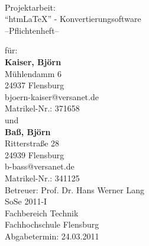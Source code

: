 \documentclass[	a4paper,		%
		titlepage, 		%
		fontsize=12pt		%
		]{scrartcl} 		%
\begin{document}
\begin{titlepage}
\centering
\resizebox*{.25\textheight}{!}{} \\
\vspace{1cm}
\Large Projektarbeit: \\ ``htm\LaTeX'' - Konvertierungsoftware\\ --Pflichtenheft--
\vspace{2cm}
\vfill
\begin{flushleft}			%
\noindent
\normalsize
für:\\ \textbf{Kaiser, Björn} \\Mühlendamm 6\\24937 Flensburg\\bjoern-kaiser@versanet.de\\ Matrikel-Nr.: 371658\\ \vspace{.5cm}
und\\ \vspace{.5cm}
\textbf{Baß, Björn} \\Ritterstraße 28\\24939 Flensburg\\b-bass@versanet.de\\ Matrikel-Nr.: 341125\\ \vspace{1cm}
\large Betreuer: Prof. Dr. Hans Werner Lang\\
SoSe 2011-I\\
Fachbereich Technik\\
Fachhochschule Flensburg\\\vspace{.5em}
Abgabetermin: 24.03.2011
\end{flushleft}
\end{titlepage}



\newpage				%



\end{document}
